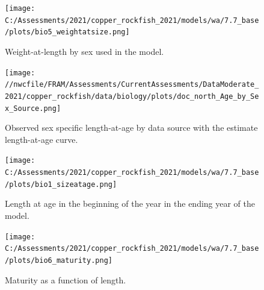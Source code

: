 \documentclass[11pt,
  english,
  a4paper,
]{article}
\begin{document}
\tagmcend\tagstructend


\begin{figure}
\centering
\texttt{[image: C:/Assessments/2021/copper\_rockfish\_2021/models/wa/7.7\_base/plots/bio5\_weightatsize.png]}
\caption{Weight-at-length by sex used in the model.\label{fig:len-weight}}
\end{figure}

\tagmcend\tagstructend


\begin{figure}
\centering
\texttt{[image: //nwcfile/FRAM/Assessments/CurrentAssessments/DataModerate\_2021/copper\_rockfish/data/biology/plots/doc\_north\_Age\_by\_Sex\_Source.png]}
\caption{Observed sex specific length-at-age by data source with the estimate length-at-age curve.\label{fig:len-age-data}}
\end{figure}

\tagmcend\tagstructend


\begin{figure}
\centering
\texttt{[image: C:/Assessments/2021/copper\_rockfish\_2021/models/wa/7.7\_base/plots/bio1\_sizeatage.png]}
\caption{Length at age in the beginning of the year in the ending year of the model.\label{fig:len-age-ss}}
\end{figure}

\tagmcend\tagstructend

\clearpage


\begin{figure}
\centering
\texttt{[image: C:/Assessments/2021/copper\_rockfish\_2021/models/wa/7.7\_base/plots/bio6\_maturity.png]}
\caption{Maturity as a function of length.\label{fig:maturity}}
\end{figure}

\tagmcend\tagstructend

\clearpage

\end{document}
